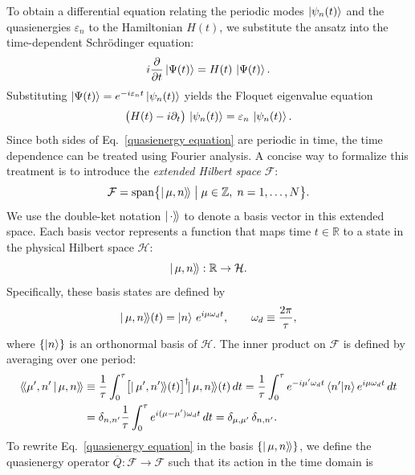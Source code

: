 \begin{appendices}
To obtain a differential equation relating the periodic modes $\ket{\psi_n(t)}$ and the quasienergies $\varepsilon_n$ to the Hamiltonian $H(t)$, we substitute the ansatz into the time-dependent Schrödinger equation:
\begin{equation}
    i\frac{\partial}{\partial t}\ket{\Psi(t)} = H(t)\,\ket{\Psi(t)}.
\end{equation}
Substituting $\ket{\Psi(t)} = e^{-i\varepsilon_n t} \ket{\psi_n(t)}$ yields the Floquet eigenvalue equation
\begin{equation}
    \label{quasienergy equation}
    \bigl(H(t)-i\partial_{t}\bigr)\,\ket{\psi_n(t)} = \varepsilon_n\,\ket{\psi_n(t)}.
\end{equation}
Since both sides of Eq.~\eqref{quasienergy equation} are periodic in time, the time dependence can be treated using Fourier analysis. A concise way to formalize this treatment is to introduce the \emph{extended Hilbert space} $\mathcal{F}$:
\begin{equation}
    \mathcal{F} = \mathrm{span}\bigl\{|\,\mu,n\rangle\!\rangle \;\big|\; \mu\in\mathbb{Z},\; n=1,\dots,N\bigr\}.
\end{equation}
We use the double-ket notation $|\,\cdot\rangle\!\rangle$ to denote a basis vector in this extended space. Each basis vector represents a function that maps time $t \in \mathbb{R}$ to a state in the physical Hilbert space $\mathcal{H}$:
\begin{equation}
    |\,\mu,n\rangle\!\rangle : \mathbb{R} \rightarrow \mathcal{H}.
\end{equation}
Specifically, these basis states are defined by
\begin{equation}
    |\,\mu,n\rangle\!\rangle(t) = \ket{n}\,e^{i\mu\omega_d t}, \qquad \omega_d \equiv \frac{2\pi}{\tau},
\end{equation}
where $\{\ket{n}\}$ is an orthonormal basis of $\mathcal{H}$. The inner product on $\mathcal{F}$ is defined by averaging over one period:
\begin{align}
    \langle\!\langle\mu',n'\,|\,\mu,n\rangle\!\rangle
    &\equiv \frac{1}{\tau}\int_{0}^{\tau}
    \bigl[|\,\mu',n'\rangle\!\rangle(t)\bigr]^\dagger \!|\,\mu,n\rangle\!\rangle(t)\,dt \nonumber= \frac{1}{\tau}\int_{0}^{\tau} e^{-i\mu'\omega_d t}\bra{n'}\ket{n}e^{i\mu\omega_d t}\,dt \nonumber\\
    &= \delta_{n,n'} \frac{1}{\tau}\int_{0}^{\tau} e^{i(\mu-\mu')\omega_d t}\,dt \nonumber= \delta_{\mu,\mu'}\,\delta_{n,n'}.
\end{align}
To rewrite Eq.~\eqref{quasienergy equation} in the basis $\{|\,\mu,n\rangle\!\rangle\}$, we define the quasienergy operator $\overline{Q}:\mathcal{F}\to\mathcal{F}$ such that its action in the time domain is

\end{appendices}
